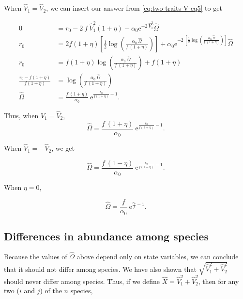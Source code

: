 When $\hat{V}_1 = \hat{V}_2$, we can insert our answer from
\ref{eq:two-traits-V-eq5} to get

\begin{equation*}
\begin{split}
    0 &= r_0 - 2 ~ f ~ \hat{V}_{1}^2 ( 1 + \eta ) -
        \alpha_0 \textrm{e}^{ -2 ~ \hat{V}_{1}^2 } \hat{\Omega} \\
    r_0 &= 2 f ( 1 + \eta ) \left[
        \frac{1}{2}
        \log \left( \frac{ \alpha_0 ~ \hat{\Omega} }{ f ~ ( 1 + \eta ) } \right)
    \right] +
        \alpha_0 \textrm{e}^{ -2 ~
            \left[
                \frac{1}{2} \log \left(
                    \frac{ \alpha_0 ~ \hat{\Omega} }{ f ~ ( 1 + \eta ) }
                \right)
            \right]
        } \hat{\Omega} \\
    r_0 &= f ( 1 + \eta ) \log \left(
        \frac{ \alpha_0 ~ \hat{\Omega} }{ f ~ ( 1 + \eta ) }
    \right) + f ( 1 + \eta ) \\
    \frac{  r_0 - f ( 1 + \eta ) }{ f ( 1 + \eta ) } &=
        \log \left(
        \frac{ \alpha_0 ~ \hat{\Omega} }{ f ~ ( 1 + \eta ) }
        \right) \\
    \hat{\Omega} &= \frac{ f ~ ( 1 + \eta ) }{ \alpha_0 } ~
        \textrm{e}^{\frac{  r_0 }{ f ( 1 + \eta ) } - 1 }
    \textrm{.}
\end{split}
\end{equation*}

Thus, when $\hat{V}_1 = \hat{V}_2$,
$$
\hat{\Omega} = \frac{ f ~ ( 1 + \eta ) }{ \alpha_0 } ~
        \textrm{e}^{\frac{ r_0 }{ f ( 1 + \eta ) } - 1 }
    \textrm{.}
$$


When $\hat{V}_1 = -\hat{V}_2$, we get

$$
    \hat{\Omega} = \frac{ f ~ ( 1 - \eta ) }{ \alpha_0 } ~
        \textrm{e}^{\frac{  r_0 }{ f ( 1 - \eta ) } - 1 }
    \textrm{.}
$$


When $\eta = 0$,

$$
    \hat{\Omega} = \frac{ f }{ \alpha_0 } ~ \textrm{e}^{\frac{ r_0 }{ f } - 1 }
    \textrm{.}
$$



\subsection*{Differences in abundance among species}

Because the values of $\hat{\Omega}$ above depend only on state variables,
we can conclude that it should not differ among species.
We have also shown that $\sqrt{\hat{V}_1^2 + \hat{V}_2^2}$ should never
differ among species.
Thus, if we define $\hat{X} = \hat{V}_1^2 + \hat{V}_2^2$,
then for any two ($i$ and $j$) of the $n$ species,

